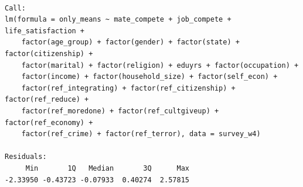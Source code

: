 \documentclass[
]{article}
\begin{document}
\begin{table}
\begin{minipage}[t]{\linewidth}
\end{minipage}%
\newline
\begin{minipage}[t]{\linewidth}

{\centering 

\begin{verbatim}

Call:
lm(formula = only_means ~ mate_compete + job_compete + life_satisfaction + 
    factor(age_group) + factor(gender) + factor(state) + factor(citizenship) + 
    factor(marital) + factor(religion) + eduyrs + factor(occupation) + 
    factor(income) + factor(household_size) + factor(self_econ) + 
    factor(ref_integrating) + factor(ref_citizenship) + factor(ref_reduce) + 
    factor(ref_moredone) + factor(ref_cultgiveup) + factor(ref_economy) + 
    factor(ref_crime) + factor(ref_terror), data = survey_w4)

Residuals:
     Min       1Q   Median       3Q      Max 
-2.33950 -0.43723 -0.07933  0.40274  2.57815 


\end{verbatim}}
\end{minipage}
\end{table}
\end{document}
